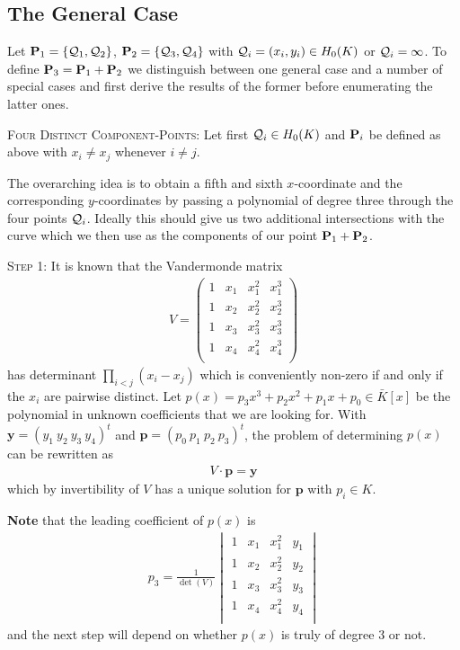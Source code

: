 \subsection{The General Case}

Let $\P_1 = \{\q_1,\q_2\}$, $\P_2 = \{\q_3,\q_4\}$ with $\q_i = (x_i,y_i) \in \enk$ or $\q_i = \infty$. To define $\P_3 = \P_1 + \P_2$ we distinguish between one general case and a number of special cases and first derive the results of the former before enumerating the latter ones.

\begin{case} {\scshape Four Distinct Component-Points:}
	Let first $\q_i \in \enk$ and $\P_i$ be defined as above with $x_i \neq x_j$ whenever $i \neq j$.

	The overarching idea is to obtain a fifth and sixth $x$-coordinate and the corresponding $y$-coordinates by passing a polynomial of degree three through the four points $\q_i$. Ideally this should give us two additional intersections with the curve which we then use as the components of our point $\P_1 + \P_2$.

	{\scshape Step 1:} It is known that the Vandermonde matrix
	\begin{align*}V=
		\begin{pmatrix}
			1 & x_1 & x_1^2 & x_1^3\\
			1 & x_2 & x_2^2 & x_2^3\\
			1 & x_3 & x_3^2 & x_3^3\\
			1 & x_4 & x_4^2 & x_4^3\\
		\end{pmatrix}
	\end{align*}
	has determinant $\prod_{i < j} (x_i-x_j)$ which is conveniently non-zero if and only if the $x_i$ are pairwise distinct. Let $p(x) = p_3 x^3 + p_2 x^2 + p_1 x + p_0 \in \bar K[x]$ be the polynomial in unknown coefficients that we are looking for. With $\textbf{y} = (y_1 \ y_2 \ y_3 \ y_4)^t$ and $\textbf{p} = (p_0 \ p_1 \ p_2 \ p_3)^t$, the problem of determining $p(x)$ can be rewritten as
	\begin{align*}
		V \cdot \mathbf{p} = \mathbf{y}
	\end{align*}
	which by invertibility of $V$ has a unique solution for $\mathbf{p}$ with $p_i\in K$.

	\textbf{Note} that the leading coefficient of $p(x)$ is
	\begin{align*}
	  p_3 = \frac{1}{\det (V)}
	  \begin{vmatrix}
			1 & x_1 & x_1^2 & y_1\\
			1 & x_2 & x_2^2 & y_2\\
			1 & x_3 & x_3^2 & y_3\\
			1 & x_4 & x_4^2 & y_4\\	  
	  \end{vmatrix}
	\end{align*}
	and the next step will depend on whether $p(x)$ is truly of degree 3 or not.


\end{case}
